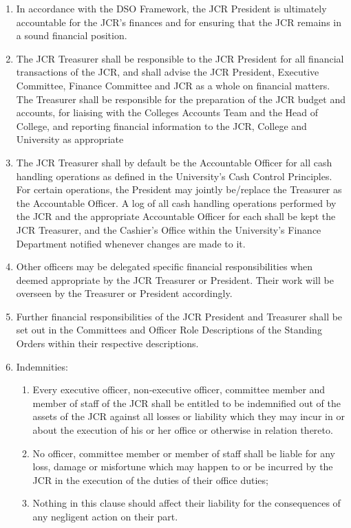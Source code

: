 \label{sc: JCR Finances}
\begin{enumerate}
    \item In accordance with the DSO Framework, the JCR President is ultimately accountable for the JCR’s finances and for ensuring that the JCR remains in a sound financial position.
    \item  The JCR Treasurer shall be responsible to the JCR President for all financial transactions of the JCR, and shall advise the JCR President, Executive Committee, Finance Committee and JCR as a whole on financial matters. The Treasurer shall be responsible for the preparation of the JCR budget and accounts, for liaising with the Colleges Accounts Team and the Head of College, and reporting financial information to the JCR, College and University as appropriate
    \item  The JCR Treasurer shall by default be the Accountable Officer for all cash handling operations as defined in the University’s Cash Control Principles. For certain operations, the President may jointly be/replace the Treasurer as the Accountable Officer. A log of all cash handling operations performed by the JCR and the appropriate Accountable Officer for each shall be kept the JCR Treasurer, and the Cashier’s Office within the University’s Finance Department notified whenever changes are made to it.
    \item Other officers may be delegated specific financial responsibilities when deemed appropriate by the JCR Treasurer or President. Their work will be overseen by the Treasurer or President accordingly.
    \item  Further financial responsibilities of the JCR President and Treasurer shall be set out in the Committees and Officer Role Descriptions of the Standing Orders within their respective descriptions.
    \item Indemnities:
    \begin{enumerate}
        \item Every executive officer, non-executive officer, committee member and member of staff of the JCR shall be entitled to be indemnified out of the assets of the JCR against all losses or liability which they may incur in or about the execution of his or her office or otherwise in relation thereto.
        \item  No officer, committee member or member of staff shall be liable for any loss, damage or misfortune which may happen to or be incurred by the JCR in the execution of the duties of their office duties;
        \item  Nothing in this clause should affect their liability for the consequences of any negligent action on their part.
    \end{enumerate}
\end{enumerate}

